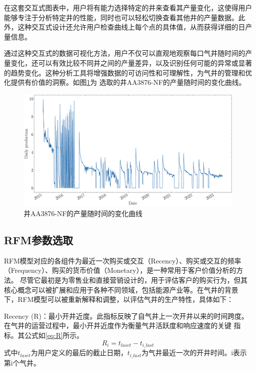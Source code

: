 在这套交互式图表中，用户将有能力选择特定的井来查看其产量变化，这使得用户能够专注于分析特定井的性能，同时也可以轻松切换查看其他井的产量数据。此外，这种交互式设计还允许用户检查曲线上每个点的具体值，从而获得详细的日产量信息。

通过这种交互式的数据可视化方法，用户不仅可以直观地观察每口气井随时间的产量变化，还可以有效比较不同井之间的产量差异，以及识别任何可能的异常或显著的趋势变化。这种分析工具将增强数据的可访问性和可理解性，为气井的管理和优化提供有价值的洞察。如图\ref{fig:dailychange}为
选取的井AA3876-NF的产量随时间的变化曲线。
\begin{figure}[H]
    \centering
    \includegraphics[width=.9\linewidth]{figure/DailyProduction_SN0004-04.pdf}
    \caption{井AA3876-NF的产量随时间的变化曲线}
    \label{fig:dailychange}
\end{figure}


\subsection{RFM参数选取}
RFM模型对应的各组件为最近一次购买或交互（Recency）、购买或交互的频率（Frequency）、购买的货币价值（Monetary），是一种常用于客户价值分析的方法。
尽管它最初是为零售业和直接营销设计的，用于评估客户的购买行为，但其核心概念可以被扩展和应用于各种不同领域，包括能源产业等。在气井的背景
下，RFM模型可以被重新解释和调整，以评估气井的生产特性，具体如下：

Recency (R)：最小开井近度。此指标反映了自气井上一次开井以来的时间跨度。在气井的运营过程中，最小开井近度作为衡量气井活跃度和响应速度的关键
指标。其公式如\eqref{eq:R}所示。
\begin{equation}
    R_i = t_{laset} - t_{i\_last}
    \label{eq:R}
\end{equation}
式中$t_{laset}$为用户定义的最后的截止日期，$t_{i\_last}$为气井最近一次的开井时间。i表示第i个气井。

